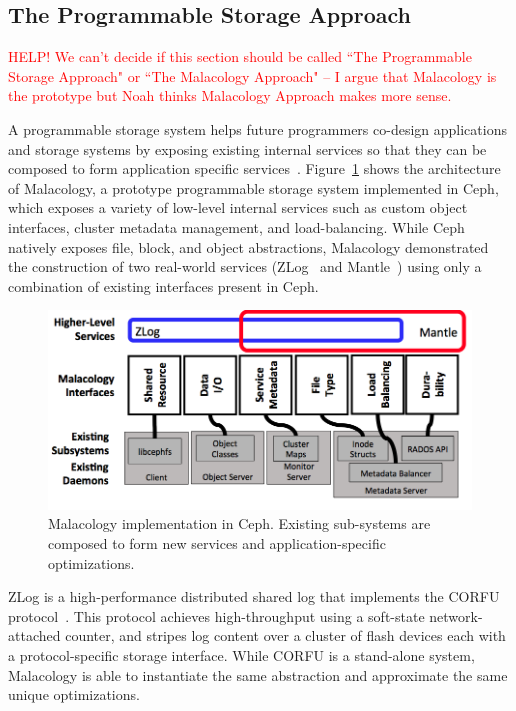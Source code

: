 \subsection{The Programmable Storage Approach}

\textcolor{red}{HELP! We can't decide if this section should be called ``The
Programmable Storage Approach" or ``The Malacology Approach" -- I argue that
Malacology is the prototype but Noah thinks Malacology Approach makes more
sense.}

A programmable storage system helps future programmers co-design applications
and storage systems by exposing existing internal services so that 
they can be composed to form application specific
services~\cite{sevilla:eurosys17}.
Figure~\ref{fig:malacology} shows the architecture of Malacology, a prototype programmable storage system
implemented in Ceph, which exposes a variety of low-level internal services
such as custom object interfaces, cluster metadata management, and
load-balancing. While Ceph natively exposes file, block, and object
abstractions, Malacology demonstrated the construction of two real-world
services (ZLog~\cite{watkins:ucsc-soe-16-12} and Mantle~\cite{sevilla:sc15-mantle}) using only a combination of existing interfaces present in Ceph.

\begin{figure}[t]
\centering
\includegraphics[width=1.0\linewidth]{implementation-overview.png}
\caption{Malacology implementation in Ceph. Existing sub-systems are composed
    to form new services and application-specific optimizations.}
\label{fig:malacology}
\end{figure}

ZLog is a high-performance distributed shared
log that implements the CORFU protocol~\cite{balakrishnan:nsdi12}.
This protocol achieves high-throughput using a soft-state network-attached
counter, and stripes log content over a cluster of flash devices each with a
protocol-specific storage interface. While CORFU is a stand-alone system,
Malacology is able to instantiate the same abstraction and approximate 
the same unique optimizations.

